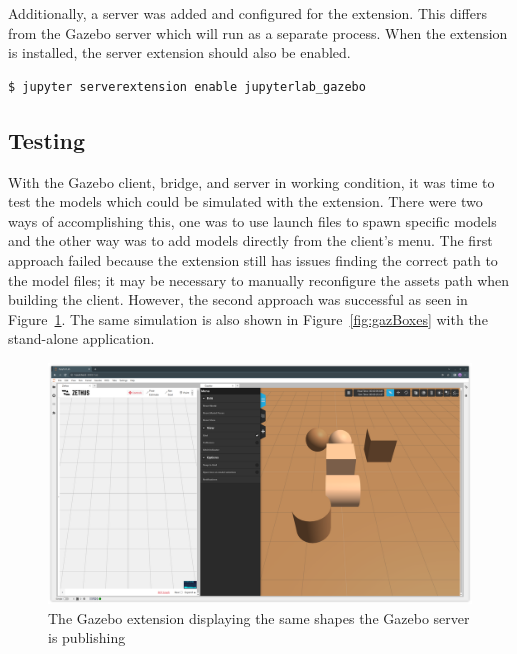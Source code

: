     \noindent Additionally, a server was added and configured for the extension. This differs from the Gazebo server which will run as a separate process. When the extension is installed, the server extension should also be enabled.

    \begin{lstlisting}[language=Console]
$ jupyter serverextension enable jupyterlab_gazebo
    \end{lstlisting}

    \subsection{Testing}

    With the Gazebo client, bridge, and server in working condition, it was time to test the models which could be simulated with the extension. There were two ways of accomplishing this, one was to use launch files to spawn specific models and the other way was to add models directly from the client's menu. The first approach failed because the extension still has issues finding the correct path to the model files; it may be necessary to manually reconfigure the assets path when building the client. However, the second approach was successful as seen in Figure~\ref{fig:Boxes}. The same simulation is also shown in Figure~\ref{fig:gazBoxes} with the stand-alone application.

    \begin{figure}[H]
        \centering
        \includegraphics[width=\linewidth]{Images/08_gazExBoxes.png}
        \caption{The Gazebo extension displaying the same shapes the Gazebo server is publishing}
        \label{fig:Boxes}
    \end{figure}

